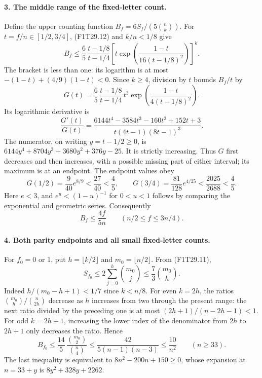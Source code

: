 \paragraph{3. The middle range of the fixed-letter count.}
Define the upper counting function
$B_f=6S_f/(5\binom nk)$.
For $t=f/n\in[1/2,3/4]$, (F1T29.12) and $k/n<1/8$ give
\[
 B_f\le
 \frac65\,\frac{t-1/8}{t-1/4}
 \left[t\exp\!\left(\frac{1-t}{16(t-1/8)^2}\right)\right]^k .
 \tag{F1T29.13}
\]
The bracket is less than one: its logarithm is at most
$-(1-t)+(4/9)(1-t)<0$.
Since $k\ge4$, division by $t$ bounds $B_f/t$ by
\[
 G(t)=\frac65\,\frac{t-1/8}{t-1/4}\,
                t^3\exp\!\left(\frac{1-t}{4(t-1/8)^2}\right).
 \tag{F1T29.14}
\]
Its logarithmic derivative is
\[
 \frac{G'(t)}{G(t)}
 =\frac{6144t^4-3584t^3-160t^2+152t+3}
        {t(4t-1)(8t-1)^3}.
 \tag{F1T29.15}
\]
The numerator, on writing $y=t-1/2\ge0$, is
$6144y^4+8704y^3+3680y^2+376y-25$.
It is strictly increasing. Thus $G$ first decreases and
then increases, with a possible missing part of either
interval; its maximum is at an endpoint. The endpoint
values obey
\[
 G(1/2)=\frac9{40}e^{8/9}<\frac{27}{40}<\frac45,\qquad
 G(3/4)=\frac{81}{128}e^{4/25}
       <\frac{2025}{2688}<\frac45 .
 \tag{F1T29.16}
\]
Here $e<3$, and $e^u<(1-u)^{-1}$ for $0<u<1$ follows
by comparing the exponential and geometric series.
Consequently
\[
                  B_f\le\frac{4f}{5n}
                       \qquad(n/2\le f\le3n/4).
 \tag{F1T29.17}
\]

\paragraph{4. Both parity endpoints and all small fixed-letter counts.}
For $f_0=0$ or $1$, put $h=\lfloor k/2\rfloor$ and
$m_0=\lfloor n/2\rfloor$. From (F1T29.11),
\[
 S_{f_0}\le2\sum_{j=0}^h\binom{m_0}j
            \le\frac73\binom{m_0}h.
 \tag{F1T29.18}
\]
Indeed $h/(m_0-h+1)<1/7$ since $k<n/8$.
For even $k=2h$, the ratios
$\binom{m_0}h/\binom n{2h}$ decrease as $h$ increases
from two through the present range: the next ratio divided
by the preceding one is at most
$(2h+1)/(n-2h-1)<1$.
For odd $k=2h+1$, increasing the lower index of the
denominator from $2h$ to $2h+1$ only decreases the ratio.
Hence
\[
 B_{f_0}\le\frac{14}{5}\,
                 \frac{\binom{m_0}2}{\binom n4}
       \le\frac{42}{5(n-1)(n-3)}
       \le\frac{10}{n^2}\qquad(n\ge33).
 \tag{F1T29.19}
\]
The last inequality is equivalent to
$8n^2-200n+150\ge0$, whose expansion at $n=33+y$ is
$8y^2+328y+2262$.

